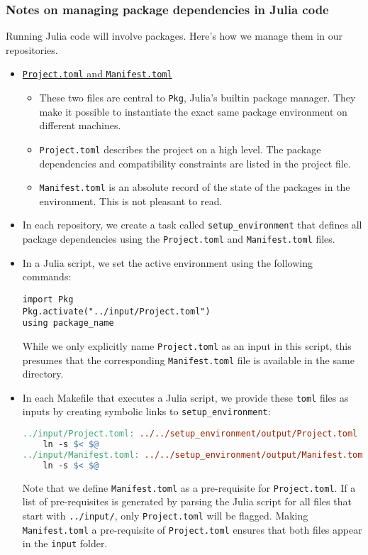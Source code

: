 \subsubsection{Notes on managing package dependencies in Julia code}
Running Julia code will involve packages.
Here's how we manage them in our repositories.
\begin{itemize}
\item \href{https://julialang.github.io/Pkg.jl/v1/toml-files/}{\texttt{Project.toml} and \texttt{Manifest.toml}}
\begin{itemize}
	\item These two files are central to \texttt{Pkg}, Julia's builtin package manager.
	They make it possible to instantiate the exact same package environment on different machines.
	\item \texttt{Project.toml} describes the project on a high level. The package dependencies and compatibility constraints are listed in the project file.
	\item \texttt{Manifest.toml} is an absolute record of the state of the packages in the environment. This is not pleasant to read.
\end{itemize}
\item In each repository, we create a task called \texttt{setup\_environment} that defines all package dependencies using the \texttt{Project.toml} and \texttt{Manifest.toml} files.
\item In a Julia script, we set the active environment using the following commands:
\begin{lstlisting}
import Pkg
Pkg.activate("../input/Project.toml")
using package_name
\end{lstlisting}
While we only explicitly name \texttt{Project.toml} as an input in this script,
this presumes that the corresponding \texttt{Manifest.toml} file is available in the same directory.
\item In each Makefile that executes a Julia script,
we provide these \texttt{toml} files as inputs by creating symbolic links to \texttt{setup\_environment}:
\begin{lstlisting}[language=make]
../input/Project.toml: ../../setup_environment/output/Project.toml | ../input/Manifest.toml ../input
	ln -s $< $@
../input/Manifest.toml: ../../setup_environment/output/Manifest.toml | ../input
	ln -s $< $@
\end{lstlisting}
Note that we define \texttt{Manifest.toml} as a pre-requisite for \texttt{Project.toml}.
If a list of pre-requisites is generated by parsing the Julia script for all files that start with \texttt{../input/},
only \texttt{Project.toml} will be flagged.
Making \texttt{Manifest.toml} a pre-requisite of \texttt{Project.toml} ensures that both files appear in the \texttt{input} folder.
\end{itemize}
